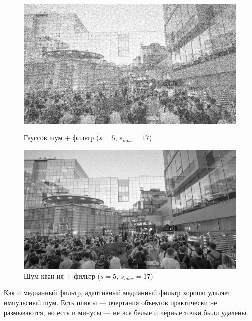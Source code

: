 \documentclass[a4paper]{article}
\begin{document}
\begin{figure}[H]
    \begin{minipage}{0.49\textwidth}
        \centering \includegraphics[width=\textwidth]{images/3_nonlinear_filters/gaussian - adaptive median (s_start=5, s_max=17).jpg}
        \caption{Гауссов шум + фильтр ($s = 5$, $s_{max}=17$)}
    \end{minipage}\hfill
    \begin{minipage}{0.49\textwidth}
        \centering \includegraphics[width=\textwidth]{images/3_nonlinear_filters/poisson - adaptive median (s_start=5, s_max=17).jpg}
        \caption{Шум кван-ия + фильтр ($s = 5$, $s_{max}=17$)}
    \end{minipage}
\end{figure}
\noindent Как и медианный фильтр, адаптивный медианный фильтр хорошо удаляет импульсный шум. Есть плюсы --- очертания объектов практически не размываются, но есть и минусы --- не все белые и чёрные точки были удалены.\newpage
\end{document}

